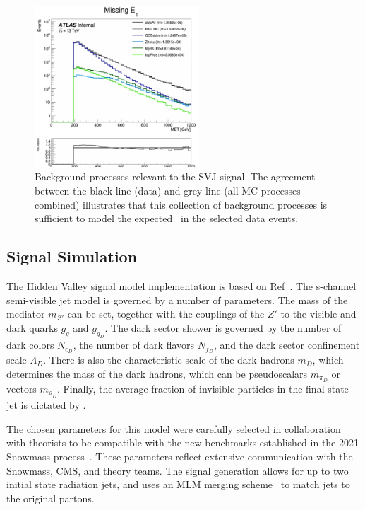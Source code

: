 \begin{figure}
        \centering
	\includegraphics[width=0.55\textwidth]{figures/ch6/bkg_mc}
	\caption{Background processes relevant to the SVJ signal. The agreement between the black line (data) and grey line (all MC processes combined) illustrates that this collection of background processes is sufficient to model the expected \met~in the selected data events.
	\label{fig:bkg_mc}}
\end{figure}

\subsection{Signal Simulation}
\label{subsec:signals}

The Hidden Valley signal model implementation is based on Ref~\cite{darkqcd}. 
The s-channel semi-visible jet model is governed by a number of parameters. 
The mass of the mediator $m_{Z'}$ can be set, together with the couplings of the $Z'$ to the visible and dark quarks $g_q$ and $g_{q_D}$. 
The dark sector shower is governed by the number of dark colors $N_{c_D}$, the number of dark flavors $N_{f_D}$, and the dark sector confinement scale $\Lambda_D$. 
There is also the characteristic scale of the dark hadrons $m_D$, which determines the mass of the dark hadrons, which can be pseudoscalars $m_{\pi_D}$ or vectors $m_{\rho_D}$. 
Finally, the average fraction of invisible particles in the final state jet is dictated by \rinv. 

The chosen parameters for this model were carefully selected in collaboration with theorists to be compatible with the new benchmarks established in the 2021 Snowmass process~\cite{snowmass}. 
These parameters reflect extensive communication with the Snowmass, CMS, and theory teams.
The signal generation allows for up to two initial state radiation jets, and uses an MLM merging scheme~\cite{pythia} to match jets to the original partons.

